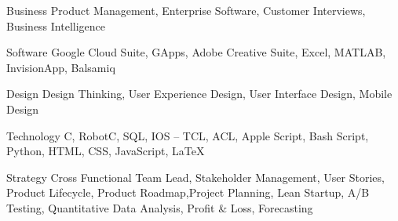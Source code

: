 

\begin{cvskills}

  \cvskill
    {Business} %
    {Product Management, Enterprise Software, Customer Interviews, Business Intelligence} %

  \cvskill
    {Software} %
    {Google Cloud Suite, GApps, Adobe Creative Suite, Excel, MATLAB, InvisionApp, Balsamiq} %

  \cvskill
    {Design} %
    {Design Thinking, User Experience Design, User Interface Design, Mobile Design} %

  \cvskill
    {Technology} %
    {C, RobotC, SQL, IOS – TCL, ACL, Apple Script, Bash Script, Python, HTML, CSS, JavaScript, LaTeX} %

  \cvskill
    {Strategy} %
    {Cross Functional Team Lead, Stakeholder Management, User Stories, Product Lifecycle, Product Roadmap,\newline Project Planning, Lean Startup, A/B Testing, Quantitative Data Analysis, Profit \& Loss, Forecasting} %
\end{cvskills}
